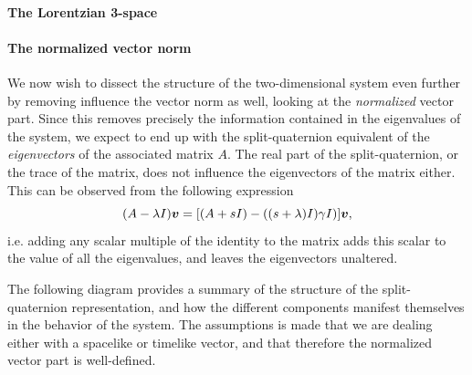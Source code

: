 \paragraph{The Lorentzian 3-space}

\paragraph{The normalized vector norm}
We now wish to dissect the structure of the two-dimensional system even further by removing influence the vector norm as well, looking at the \emph{normalized} vector part. Since this removes precisely the information contained in the eigenvalues of the system, we expect to end up with the split-quaternion equivalent of the \emph{eigenvectors} of the associated matrix $A$. The real part of the split-quaternion, or the trace of the matrix, does not influence the eigenvectors of the matrix either. This can be observed from the following expression
$$ (A - \lambda I)\vec{v} = \qty[(A + s I) - ((s + \lambda) I) \gamma I)]\vec{v}, $$
i.e. adding any scalar multiple of the identity to the matrix adds this scalar to the value of all the eigenvalues, and leaves the eigenvectors unaltered.

The following diagram provides a summary of the structure of the split-quaternion representation, and how the different components manifest themselves in the behavior of the system. The assumptions is made that we are dealing either with a spacelike or timelike vector, and that therefore the normalized vector part is well-defined.
\begin{center}
\end{center}

